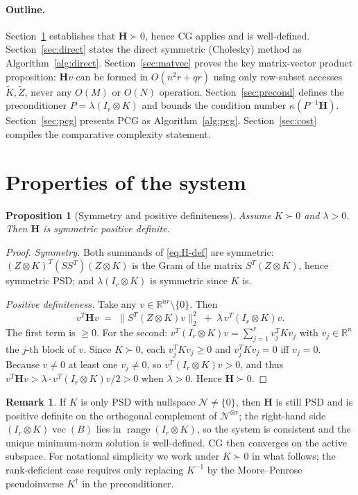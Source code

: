 \documentclass[12pt]{article}
\newtheorem{proposition}[theorem]{Proposition}
\theoremstyle{definition}
\newtheorem{remark}[theorem]{Remark}
\newcommand{\vecop}{\operatorname{vec}}
\newcommand{\range}{\operatorname{range}}
\newcommand{\R}{\mathbb{R}}
\newcommand{\Kt}{\widetilde{K}}
\newcommand{\Zt}{\widetilde{Z}}
\begin{document}
\paragraph{Outline.}
Section~\ref{sec:proper} establishes that $\mathbf{H}\succ 0$, hence CG applies and is
well-defined.
Section~\ref{sec:direct} states the direct symmetric (Cholesky) method as Algorithm~\ref{alg:direct}.
Section~\ref{sec:matvec} proves the key matrix-vector product proposition: $\mathbf{H}v$ can be
formed in $O(n^2r+qr)$ using only row-subset accesses $\Kt,\Zt$, never any $O(M)$ or $O(N)$
operation.
Section~\ref{sec:precond} defines the preconditioner $P=\lambda(I_r\otimes K)$ and bounds the
condition number $\kappa(P^{-1}\mathbf{H})$.
Section~\ref{sec:pcg} presents PCG as Algorithm~\ref{alg:pcg}.
Section~\ref{sec:cost} compiles the comparative complexity statement.

\section{Properties of the system}\label{sec:proper}

\begin{proposition}[Symmetry and positive definiteness]\label{prop:psd}
Assume $K\succ 0$ and $\lambda>0$. Then $\mathbf{H}$ is symmetric positive definite.
\end{proposition}

\begin{proof}
\emph{Symmetry.} Both summands of \eqref{eq:H-def} are symmetric:
$(Z\otimes K)^T(SS^T)(Z\otimes K)$ is the Gram of the matrix $S^T(Z\otimes K)$, hence symmetric
PSD; and $\lambda(I_r\otimes K)$ is symmetric since $K$ is.

\emph{Positive definiteness.} Take any $v\in\R^{nr}\setminus\{0\}$. Then
\[
v^T \mathbf{H} v
\;=\; \|S^T(Z\otimes K)v\|_2^2 \;+\; \lambda\,v^T(I_r\otimes K)v.
\]
The first term is $\geq 0$. For the second: $v^T(I_r\otimes K)v=\sum_{j=1}^r v_j^T K v_j$ with
$v_j\in\R^n$ the $j$-th block of $v$. Since $K\succ 0$, each $v_j^T K v_j\geq 0$ and
$v_j^T K v_j=0$ iff $v_j=0$. Because $v\neq 0$ at least one $v_j\neq 0$, so
$v^T(I_r\otimes K)v>0$, and thus $v^T\mathbf{H}v>\lambda\cdot v^T(I_r\otimes K)v/2>0$
when $\lambda>0$. Hence $\mathbf{H}\succ 0$.
\end{proof}

\begin{remark}\label{rmk:psd-only}
If $K$ is only PSD with nullspace $\mathcal{N}\neq\{0\}$, then $\mathbf{H}$ is still PSD and is
positive definite on the orthogonal complement of $\mathcal{N}^{\otimes r}$; the right-hand side
$(I_r\otimes K)\vecop(B)$ lies in $\range(I_r\otimes K)$, so the system is consistent and the
unique minimum-norm solution is well-defined. CG then converges on the active subspace. For
notational simplicity we work under $K\succ 0$ in what follows; the rank-deficient case requires
only replacing $K^{-1}$ by the Moore--Penrose pseudoinverse $K^\dagger$ in the preconditioner.
\end{remark}
\end{document}
